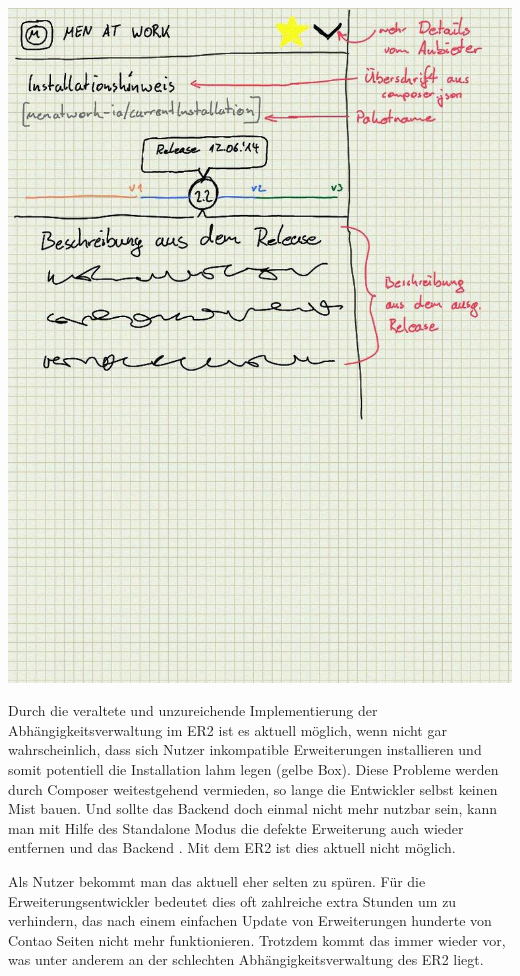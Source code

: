 \documentclass[
paper=a4,
draft=false,%
fontsize=10pt%
]{scrartcl}
\begin{document}
\includegraphics[width=\textwidth]{bilder/tristan-scribble-2.jpg}

Durch die veraltete und unzureichende Implementierung der Abhängigkeitsverwaltung im ER2 ist es aktuell möglich, wenn nicht gar wahrscheinlich, dass sich Nutzer inkompatible Erweiterungen installieren und somit potentiell die Installation lahm legen (gelbe Box). Diese Probleme werden durch Composer weitestgehend vermieden, so lange die Entwickler selbst keinen Mist bauen. Und sollte das Backend doch einmal nicht mehr nutzbar sein, kann man mit Hilfe des Standalone Modus die defekte Erweiterung auch wieder entfernen und das Backend . Mit dem ER2 ist dies aktuell nicht möglich.

Als Nutzer bekommt man das aktuell eher selten zu spüren. Für die Erweiterungsentwickler bedeutet dies oft zahlreiche extra Stunden um zu verhindern, das nach einem einfachen Update von Erweiterungen hunderte von Contao Seiten nicht mehr funktionieren. Trotzdem kommt das immer wieder vor, was unter anderem an der schlechten Abhängigkeitsverwaltung des ER2 liegt.
\end{document}
